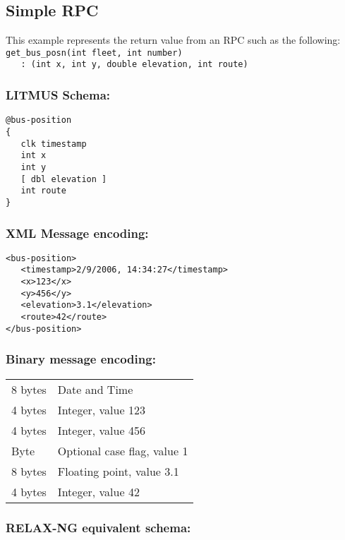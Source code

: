 \documentclass[12pt,a4paper,twoside]{article}
\renewcommand{\_}{\texttt{\symbol{95}}}
\begin{document}
\subsection{Simple RPC}

This example represents the return value from an RPC such as the following:\\
\verb^get_bus_posn(int fleet, int number)^\\
\verb^   : (int x, int y, double elevation, int route)^

\subsubsection*{LITMUS Schema:}

\begin{verbatim}
@bus-position
{
   clk timestamp
   int x
   int y
   [ dbl elevation ]
   int route
}
\end{verbatim}

\subsubsection*{XML Message encoding:}

\begin{verbatim}
<bus-position>
   <timestamp>2/9/2006, 14:34:27</timestamp>
   <x>123</x>
   <y>456</y>
   <elevation>3.1</elevation>
   <route>42</route>
</bus-position>
\end{verbatim}

\subsubsection*{Binary message encoding:}

\begin{tabular}{ll}
8 bytes & Date and Time\\
4 bytes & Integer, value 123\\
4 bytes & Integer, value 456\\
Byte & Optional case flag, value 1\\
8 bytes & Floating point, value 3.1\\
4 bytes & Integer, value 42\\
\end{tabular}

\subsubsection*{RELAX-NG equivalent schema:}
\end{document}
